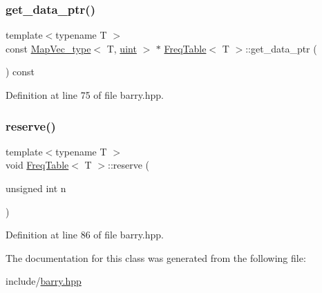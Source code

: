 \subsubsection{\texorpdfstring{get\+\_\+data\+\_\+ptr()}{get\_data\_ptr()}}
{\footnotesize\ttfamily template$<$typename T $>$ \\
const \hyperlink{namespacebarry_a2f0d3aab1d67e4c8eaeab9022e16139f}{Map\+Vec\+\_\+type}$<$ T, \hyperlink{namespacebarry_a11dfc53ddb4672278319aa04f1e09a6c}{uint} $>$ $\ast$ \hyperlink{classbarry_1_1_freq_table}{Freq\+Table}$<$ T $>$\+::get\+\_\+data\+\_\+ptr (\begin{DoxyParamCaption}{ }\end{DoxyParamCaption}) const\hspace{0.3cm}{\ttfamily [inline]}}



Definition at line 75 of file barry.\+hpp.

\mbox{\label{classbarry_1_1_freq_table_a0bdced25f7c0bee38e073c4654578d19}} 
\subsubsection{\texorpdfstring{reserve()}{reserve()}}
{\footnotesize\ttfamily template$<$typename T $>$ \\
void \hyperlink{classbarry_1_1_freq_table}{Freq\+Table}$<$ T $>$\+::reserve (\begin{DoxyParamCaption}\item[{unsigned int}]{n }\end{DoxyParamCaption})\hspace{0.3cm}{\ttfamily [inline]}}



Definition at line 86 of file barry.\+hpp.



The documentation for this class was generated from the following file\+:\begin{DoxyCompactItemize}
\item 
include/\hyperlink{barry_8hpp}{barry.\+hpp}\end{DoxyCompactItemize}

